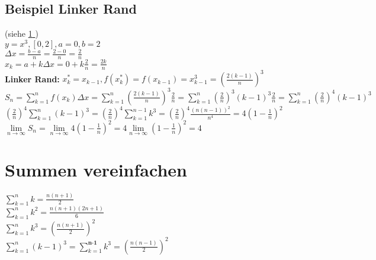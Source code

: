 \documentclass[../main.tex]{subfiles}
\begin{document}
\subsection{Beispiel Linker Rand}
(siehe \hyperref[sec:Summen_vereinfachen]{\ref{sec:Summen_vereinfachen} }) \\
$y = x^3, [0,2], a=0, b=2$ \\ [7pt]
$\Delta x = \frac{b-a}{n} = \frac{2-0}{n} = \frac{2}{n}$ \\ [7pt]
$x_k = a + k \Delta x = 0 + k \frac{2}{n} = \frac{2k}{n}$ \\ [7pt]
\textbf{Linker Rand:} $x^*_k = x_{k-1}, f(x^*_k)=f(x_{k-1})=x^3_{k-1}=(\frac{2(k-1)}{n})^3$ \\ [7pt]
$S_n = \sum\limits^n_{k=1}f(x_k)\Delta x = \sum\limits^n_{k=1} (\frac{2(k-1)}{n})^3 \frac{2}{n}
= \sum\limits^n_{k=1} (\frac{2}{n})^3 (k-1)^3 \frac{2}{n}
= \sum\limits^n_{k=1} (\frac{2}{n})^4 (k-1)^3 $ \\ [7pt]
$(\frac{2}{n})^4 \sum\limits^n_{k=1} (k-1)^3
= (\frac{2}{n})^4 \sum\limits^{n -1}_{k=1} k^3 
= (\frac{2}{n})^4 \frac{(n(n-1))^2}{n^4} = 4(1-\frac{1}{n})^2$ \\ [7pt]
$\lim\limits_{n \to \infty} S_n = \lim\limits_{n \to \infty} 4(1-\frac{1}{n})^2 = 4 \lim\limits_{n \to \infty} (1-\frac{1}{n})^2 = 4$

\section{Summen vereinfachen}
\label{sec:Summen_vereinfachen}
$\sum\limits^n_{k=1} k = \frac{n(n+1)}{2}$ \\ [7pt]
$\sum\limits^n_{k=1} k^2 = \frac{n(n+1)(2n+1)}{6}$ \\ [7pt]
$\sum\limits^n_{k=1} k^3 = (\frac{n(n+1)}{2})^2$ \\ [7pt]
$\sum\limits^n_{k=1} (k-1)^3 = \sum\limits^{\textbf{n-1}}_{k=1} k^3 = (\frac{n(n-1)}{2})^2$
\end{document}
